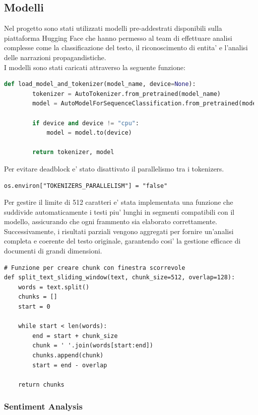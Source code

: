 \documentclass{article}
\begin{document}
	\subsection{Modelli}
	
	Nel progetto sono stati utilizzati modelli pre-addestrati disponibili sulla piattaforma Hugging Face che hanno permesso al team di effettuare analisi complesse come la classificazione del testo, il riconoscimento di entita' e l'analisi delle narrazioni propagandistiche.\\
	I modelli sono stati caricati attraverso la seguente funzione:
	\begin{lstlisting}[language=python]
	def load_model_and_tokenizer(model_name, device=None):
		tokenizer = AutoTokenizer.from_pretrained(model_name)
		model = AutoModelForSequenceClassification.from_pretrained(model_name)
		
		if device and device != "cpu":
			model = model.to(device)
		
		return tokenizer, model
	\end{lstlisting}
	Per evitare deadblock e' stato disattivato il parallelismo tra i tokenizers.
	\begin{lstlisting}
os.environ["TOKENIZERS_PARALLELISM"] = "false"
	\end{lstlisting}

	Per gestire il limite di 512 caratteri e' stata implementata una  funzione che suddivide automaticamente i testi piu' lunghi in segmenti compatibili con il modello, assicurando che ogni frammento sia elaborato correttamente.\\
	Successivamente, i risultati parziali vengono aggregati per fornire un'analisi completa e coerente del testo originale, garantendo cosi' la gestione efficace di documenti di grandi dimensioni.
	\begin{lstlisting}
# Funzione per creare chunk con finestra scorrevole
def split_text_sliding_window(text, chunk_size=512, overlap=128):
	words = text.split()
	chunks = []
	start = 0
	
	while start < len(words):
		end = start + chunk_size
		chunk = ' '.join(words[start:end])
		chunks.append(chunk)
		start = end - overlap

	return chunks
	\end{lstlisting}

		\subsubsection{Sentiment Analysis}
	
\end{document}
